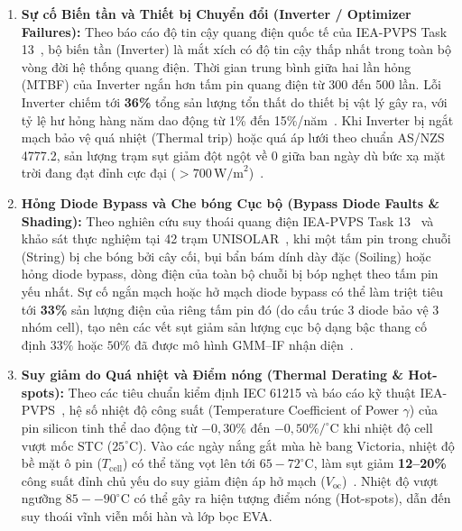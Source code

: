 \documentclass[12pt, a4paper]{report}
\begin{document}
\begin{enumerate}[label=\arabic*., leftmargin=*]
    \item \textbf{Sự cố Biến tần và Thiết bị Chuyển đổi (Inverter / Optimizer Failures):}
    Theo báo cáo độ tin cậy quang điện quốc tế của IEA-PVPS Task 13~\cite{iea2023pvps}, bộ biến tần (Inverter) là mắt xích có độ tin cậy thấp nhất trong toàn bộ vòng đời hệ thống quang điện. Thời gian trung bình giữa hai lần hỏng (MTBF) của Inverter ngắn hơn tấm pin quang điện từ 300 đến 500 lần. Lỗi Inverter chiếm tới \textbf{36\%} tổng sản lượng tổn thất do thiết bị vật lý gây ra, với tỷ lệ hư hỏng hàng năm dao động từ 1\% đến 15\%/năm~\cite{iea2023pvps}. Khi Inverter bị ngắt mạch bảo vệ quá nhiệt (Thermal trip) hoặc quá áp lưới theo chuẩn AS/NZS 4777.2, sản lượng trạm sụt giảm đột ngột về 0 giữa ban ngày dù bức xạ mặt trời đang đạt đỉnh cực đại ($> 700 \, \text{W/m}^2$)~\cite{wimalaratne2022unisolar}.

    \item \textbf{Hỏng Diode Bypass và Che bóng Cục bộ (Bypass Diode Faults \& Shading):}
    Theo nghiên cứu suy thoái quang điện IEA-PVPS Task 13~\cite{iea2023pvps} và khảo sát thực nghiệm tại 42 trạm UNISOLAR~\cite{wimalaratne2022unisolar}, khi một tấm pin trong chuỗi (String) bị che bóng bởi cây cối, bụi bẩn bám dính dày đặc (Soiling) hoặc hỏng diode bypass, dòng điện của toàn bộ chuỗi bị bóp nghẹt theo tấm pin yếu nhất. Sự cố ngắn mạch hoặc hở mạch diode bypass có thể làm triệt tiêu tới \textbf{33\%} sản lượng điện của riêng tấm pin đó (do cấu trúc 3 diode bảo vệ 3 nhóm cell), tạo nên các vết sụt giảm sản lượng cục bộ dạng bậc thang cố định $33\%$ hoặc $50\%$ đã được mô hình GMM--IF nhận diện~\cite{li2025gmmif}.

    \item \textbf{Suy giảm do Quá nhiệt và Điểm nóng (Thermal Derating \& Hot-spots):}
    Theo các tiêu chuẩn kiểm định IEC 61215 và báo cáo kỹ thuật IEA-PVPS~\cite{iea2023pvps}, hệ số nhiệt độ công suất (Temperature Coefficient of Power $\gamma$) của pin silicon tinh thể dao động từ $-0{,}30\%$ đến $-0{,}50\%/^\circ\text{C}$ khi nhiệt độ cell vượt mốc STC ($25^\circ\text{C}$). Vào các ngày nắng gắt mùa hè bang Victoria, nhiệt độ bề mặt ô pin ($T_{\text{cell}}$) có thể tăng vọt lên tới $65-72^\circ\text{C}$, làm sụt giảm \textbf{12--20\%} công suất đỉnh chủ yếu do suy giảm điện áp hở mạch ($V_{\text{oc}}$)~\cite{wimalaratne2022unisolar}. Nhiệt độ vượt ngưỡng $85--90^\circ\text{C}$ có thể gây ra hiện tượng điểm nóng (Hot-spots), dẫn đến suy thoái vĩnh viễn mối hàn và lớp bọc EVA.


\end{enumerate}
\end{document}
